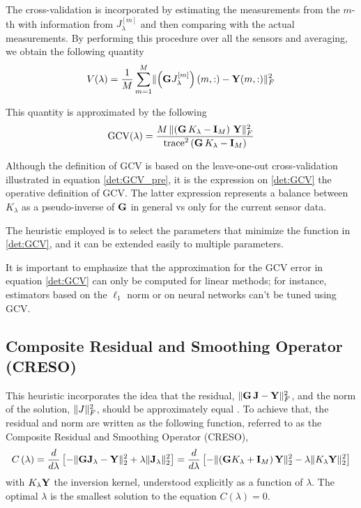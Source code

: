 The cross-validation is incorporated by estimating the measurements from the $m$-th with information from $J_\lambda^{[m]}$ and then comparing with the actual measurements.
%
By performing this procedure over all the sensors and averaging, we obtain the following quantity
\begin{equation}
V(\lambda) = 
\frac{1}{M}
\sum_{m=1}^M
\lVert  \left(  \mathbf{G} J_\lambda^{[m]}  \right)(m, :) - \mathbf{Y}(m,:)  \rVert_F^2
\label{det:GCV_pre}
\end{equation}

This quantity is approximated by the following
\begin{equation}
\text{GCV}(\lambda) = 
\frac{M\, \lVert \left( \mathbf{G}\, K_\lambda -\mathbf{I}_M  \right)\, \mathbf{Y} \rVert_F^2}{\text{trace}^2\left( \mathbf{G}\, K_\lambda - \mathbf{I}_M \right)}
\label{det:GCV}
\end{equation}

Although the definition of GCV is based on the leave-one-out cross-validation illustrated in equation \eqref{det:GCV_pre}, it is the expression on \eqref{det:GCV} the operative definition of GCV.
%
The latter expression represents a balance between $K_\lambda$ as a pseudo-inverse of $\mathbf{G}$ in general vs only for the current sensor data.

The heuristic employed is to select the parameters that minimize the function in \eqref{det:GCV}, and it can be extended easily to multiple parameters.

It is important to emphasize that the approximation for the GCV error in equation \eqref{det:GCV} can only be computed for linear methods; for instance, estimators based on the $\ell_1$ norm or on neural networks can't be tuned using GCV.

\subsection{Composite Residual and Smoothing Operator (CRESO)}

This heuristic incorporates the idea that the residual, $\lVert \mathbf{G}\, \mathbf{J} - \mathbf{Y} \rVert_F^2$, and the norm of the solution, $\lVert J \rVert_F^2$, should be approximately equal \cite{creso}.
%
To achieve that, the residual and norm are written as the following function, referred to as the Composite Residual and Smoothing Operator (CRESO),
\begin{equation}
C\left( \lambda \right) = 
\frac{d}{d\lambda} \left[  -\lVert \mathbf{G}\mathbf{J}_\lambda - \mathbf{Y} \rVert_2^2 + \lambda \lVert \mathbf{J}_\lambda \rVert_2^2 \right]
=
\frac{d}{d\lambda} \left[  - \lVert \left( \mathbf{G} K_\lambda + \mathbf{I}_M \right)\mathbf{Y} \rVert_2^2 - \lambda \lVert K_\lambda \mathbf{Y} \rVert_2^2 \right]
\end{equation}
with $K_\lambda \mathbf{Y}$ the inversion kernel, understood explicitly as a function of $\lambda$. 
%
The optimal $\lambda$ is the smallest solution to the equation $C(\lambda)=0$.

